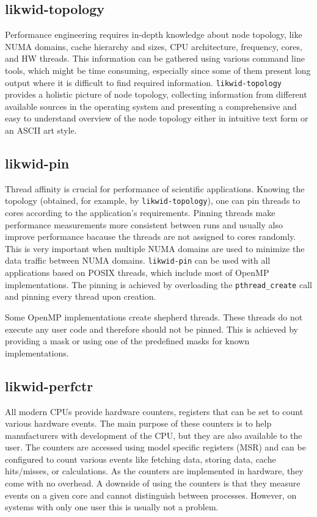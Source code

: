 \subsection*{likwid-topology}

Performance engineering requires  in-depth knowledge about node topology, like NUMA domains, cache hierarchy and sizes, CPU architecture, frequency, cores, and HW threads.
This information can be gathered using various command line tools, which might be time consuming, especially since some of them present long output where it is difficult to find required information. \texttt{likwid-topology} provides a holistic picture of node topology, collecting information from different available sources in the operating system and presenting a comprehensive and easy to understand overview of the node topology either in intuitive text form or an ASCII art style.

\subsection*{likwid-pin}

Thread affinity is crucial for performance of scientific applications. Knowing the topology (obtained, for example, by \texttt{likwid-topology}), one can pin threads to cores according to the application's requirements.
Pinning threads make performance measurements more consistent between runs and usually also improve performance bacause the threads are not assigned to cores randomly. This is very important when multiple NUMA domains are used to minimize the data traffic between NUMA domains.
%
\texttt{likwid-pin} can be used with all applications based on POSIX threads, which include most of OpenMP implementations. The pinning is achieved by overloading the \texttt{pthread\_create} call and pinning every thread upon creation.

Some OpenMP implementations create shepherd threads. These threads do not execute any user code and therefore should not be pinned. This is achieved by providing a mask or using one of the predefined masks for known implementations.

\subsection*{likwid-perfctr}

All modern CPUs provide hardware counters, registers that can be set to count various hardware events. The main purpose of these counters is to help manufacturers with development of the CPU, but they are also available to the user. The counters are accessed using model specific registers (MSR) and can be configured to count various events like fetching data, storing data, cache hits/misses, or calculations. As the counters are implemented in hardware, they come with no overhead. A downside of using the counters is that they measure events on a given core and cannot distinguish between processes. However, on systems with only one user this is usually not a problem.

